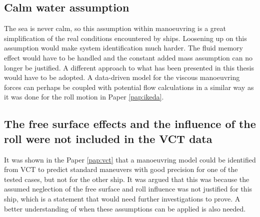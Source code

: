 \subsection*{Calm water assumption}
The sea is never calm, so this assumption within manoeuvring is a great simplification of the real conditions encountered by ships. Loosening up on this assumption would make system identification much harder. The fluid memory effect would have to be handled and the constant added mass assumption can no longer be justified. A different approach to what has been presented in this thesis would have to be adopted. A data-driven model for the viscous manoeuvring forces can perhaps be coupled with potential flow calculations in a similar way as it was done for the roll motion in Paper \ref{pap:ikeda}.  
    
\subsection*{The free surface effects and the influence of the roll were not included in the VCT data}
It was shown in the Paper \ref{pap:vct} that a manoeuvring model could be identified from VCT to predict standard maneuvers with good precision for one of the tested cases, but not for the other ship. 
It was argued that this was because the assumed neglection of the free surface and roll influence was not justified for this ship, which is a statement that would need further investigations to prove. A better understanding of when these assumptions can be applied is also needed.   
        

